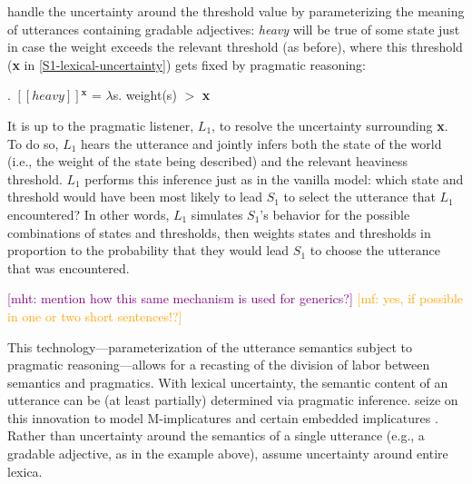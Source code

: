 \documentclass{sp}
\newcommand{\gcs}[1]{\textcolor{blue}{[gcs: #1]}}
\newcommand{\mf}[1]{\textcolor{orange}{[mf: #1]}}
\newcommand{\mht}[1]{\textcolor{purple}{[mht: #1]}}
\newcommand{\lam}{\ensuremath{\lambda}}
\newcommand{\sem}[1]{\ensuremath{[\![#1]\!]}}
\begin{document}
\citeauthor{lassitergoodman2013} handle the uncertainty around the threshold value by parameterizing the meaning of utterances containing gradable adjectives: \emph{heavy} will be true of some state just in case the weight exceeds the relevant threshold (as before), where this threshold (\textbf{x} in \eqref{S1-lexical-uncertainty}) gets fixed by pragmatic reasoning:

\ex. \label{heavy-sem}
\sem{heavy}$^{\textbf{x}}$ = \lam s. weight(s) $>$ \textbf{x}

It is up to the pragmatic listener, $L_1$, to resolve the uncertainty surrounding \textbf{x}. To do so, $L_1$ hears the utterance and jointly infers both the state of the world (i.e., the weight of the state being described) and the relevant heaviness threshold. $L_1$ performs this inference just as in the vanilla model: which state and threshold would have been most likely to lead $S_1$ to select the utterance that $L_1$ encountered? In other words, $L_1$ simulates $S_1$'s behavior for the possible combinations of states and thresholds, then weights states and thresholds in proportion to the probability that they would lead $S_1$ to choose the utterance that was encountered.

\mht{mention how this same mechanism is used for generics?} \mf{yes, if possible in one or two short sentences!?}

This technology---parameterization of the utterance semantics subject to pragmatic reasoning---allows for a recasting of the division of labor between semantics and pragmatics. With lexical uncertainty, the semantic content of an utterance can be (at least partially) determined via pragmatic inference. \cite{bergenetal2016} seize on this innovation to model M-implicatures \citep{horn1984} and certain embedded implicatures \citep{hurford1974,chierchiaetal2012}. Rather than uncertainty around the semantics of a single utterance (e.g., a gradable adjective, as in the example above), \citeauthor{bergenetal2016} assume uncertainty around entire lexica. %
\end{document}
